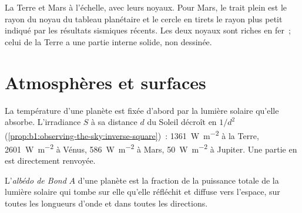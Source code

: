 \begin{omfigure}

{\small La Terre et Mars à l'échelle, avec leurs noyaux. Pour Mars, le trait
plein est le rayon du noyau du tableau planétaire et le cercle en tirets le
rayon plus petit indiqué par les résultats sismiques récents. Les deux noyaux
sont riches en fer~; celui de la Terre a une partie interne solide, non
dessinée.}
\end{omfigure}

\section{Atmosphères et surfaces}

La température d'une planète est fixée d'abord par la lumière solaire qu'elle
absorbe. L'irradiance $S$ à sa distance $d$ du Soleil décroît en $1/d^2$
(\cref{prop:b1:observing-the-sky:inverse-square})~: \qty{1361}{W.m^{-2}} à
la Terre, \qty{2601}{W.m^{-2}} à Vénus, \qty{586}{W.m^{-2}} à Mars,
\qty{50}{W.m^{-2}} à Jupiter. Une partie en est directement renvoyée.

\begin{definition}\label{def:b1:comparative-planetology:albedo}
L'\emph{albédo de Bond} $A$ d'une planète est la fraction de la puissance totale
de la lumière solaire qui tombe sur elle qu'elle réfléchit et diffuse vers
l'espace, sur toutes les longueurs d'onde et dans toutes les directions.
\end{definition}

